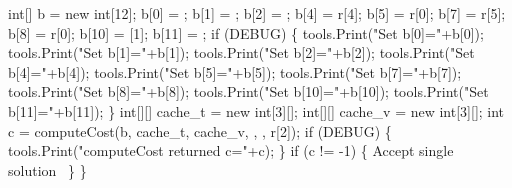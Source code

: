   int[] b = new int[12];
  b[0] = ;
  b[1] = ;
  b[2] = ;
  b[4] = r[4];
  b[5] = r[0];
  b[7] = r[5];
  b[8] = r[0];
  b[10] = [1];
  b[11] = ;
  if (DEBUG) \{
    tools.Print("Set b[0]="+b[0]);
    tools.Print("Set b[1]="+b[1]);
    tools.Print("Set b[2]="+b[2]);
    tools.Print("Set b[4]="+b[4]);
    tools.Print("Set b[5]="+b[5]);
    tools.Print("Set b[7]="+b[7]);
    tools.Print("Set b[8]="+b[8]);
    tools.Print("Set b[10]="+b[10]);
    tools.Print("Set b[11]="+b[11]);
  \}
  int[][] cache_t = new int[3][];
  int[][] cache_v = new int[3][];
  int c = computeCost(b, cache_t, cache_v, , , r[2]);
  if (DEBUG) \{
    tools.Print("computeCost returned c="+c);
  \}
  if (c != -1) \{
    \LA{}Accept single solution~{\nwtagstyle{}}\RA{}
  \}
\}
\nwendcode{}\nwdocspar

